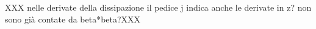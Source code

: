 XXX nelle derivate della dissipazione il pedice j indica anche le derivate in z? non sono già contate da beta*beta?XXX

